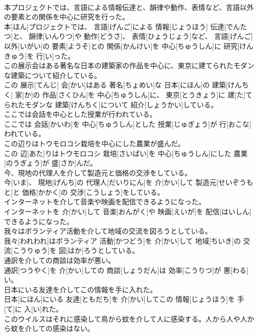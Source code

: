 \documentclass[8pt]{extreport}
\begin{document}
\begin{CJK}{UTF8}{min}
\\	本プロジェクトでは、言語による情報伝達と、韻律や動作、表情など、言語以外の要素との関係を中心に研究を行った。	
\\	本[ほん]プロジェクトでは、 言語[げんご]による 情報[じょうほう] 伝達[でんたつ]と、 韻律[いんりつ]や 動作[どうさ]、 表情[ひょうじょう]など、 言語[げんご] 以外[いがい]の 要素[ようそ]との 関係[かんけい]を 中心[ちゅうしん]に 研究[けんきゅう]を 行[い]った。
\\	この展示会はある著名な日本の建築家の作品を中心に、東京に建てられたモダンな建築について紹介している。	
\\	この 展示[てんじ] 会[かい]はある 著名[ちょめい]な 日本[にほん]の 建築[けんちく] 家[か]の 作品[さくひん]を 中心[ちゅうしん]に、 東京[とうきょう]に 建[た]てられたモダンな 建築[けんちく]について 紹介[しょうかい]している。
\\	ここでは会話を中心とした授業が行われている。	
\\	ここでは 会話[かいわ]を 中心[ちゅうしん]とした 授業[じゅぎょう]が 行[おこな]われている。
\\	この辺りはトウモロコシ栽培を中心にした農業が盛んだ。	
\\	この 辺[あた]りはトウモロコシ 栽培[さいばい]を 中心[ちゅうしん]にした 農業[のうぎょう]が 盛[さか]んだ。
\\	今、現地の代理人を介して製造元と価格の交渉をしている。	
\\	今[いま]、 現地[げんち]の 代理人[だいりにん]を 介[かい]して 製造元[せいぞうもと]と 価格[かかく]の 交渉[こうしょう]をしている。
\\	インターネットを介して音楽や映画を配信できるようになった。	
\\	インターネットを 介[かい]して 音楽[おんがく]や 映画[えいが]を 配信[はいしん]できるようになった。
\\	我々はボランティア活動を介して地域の交流を図ろうとしている。	
\\	我々[われわれ]はボランティア 活動[かつどう]を 介[かい]して 地域[ちいき]の 交流[こうりゅう]を 図[はか]ろうとしている。
\\	通訳を介しての商談は効率が悪い。	
\\	通訳[つうやく]を 介[かい]しての 商談[しょうだん]は 効率[こうりつ]が 悪[わる]い。
\\	日本にいる友達を介してこの情報を手に入れた。	
\\	日本[にほん]にいる 友達[ともだち]を 介[かい]してこの 情報[じょうほう]を 手[て]に 入[い]れた。
\\	このウイルスはそれに感染して鳥から蚊を介して人に感染する。人から人や人から蚊を介しての感染はない。	

\end{CJK}
\end{document}
